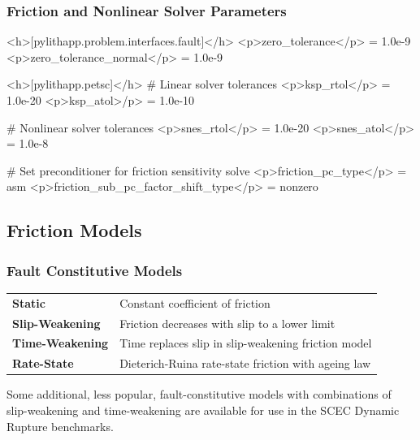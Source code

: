 \documentclass[aspectratio=169]{beamer}
\begin{document}
\begin{frame}[fragile]
  \frametitle{Friction and Nonlinear Solver Parameters}

  \begin{cfg}
<h>[pylithapp.problem.interfaces.fault]</h>
<p>zero_tolerance</p> = 1.0e-9
<p>zero_tolerance_normal</p> = 1.0e-9

<h>[pylithapp.petsc]</h>
# Linear solver tolerances
<p>ksp_rtol</p> = 1.0e-20
<p>ksp_atol>/p> = 1.0e-10

# Nonlinear solver tolerances
<p>snes_rtol</p> = 1.0e-20
<p>snes_atol</p> = 1.0e-8

# Set preconditioner for friction sensitivity solve
<p>friction_pc_type</p> = asm
<p>friction_sub_pc_factor_shift_type</p> = nonzero
\end{cfg}
    
\end{frame}


\subsection{Friction Models}

\begin{frame}
  \frametitle{Fault Constitutive Models}

  \begin{tabular}{lp{3in}}
    {\bf\color{green} Static} & Constant coefficient of friction \\
    {\bf\color{green} Slip-Weakening} & Friction decreases with slip to a
    lower limit \\
    {\bf\color{green} Time-Weakening} & Time replaces slip in slip-weakening
    friction model \\
    {\bf\color{green} Rate-State} & Dieterich-Ruina rate-state friction with
    ageing law 
  \end{tabular}
  
  \vfill 
  Some additional, less popular, fault-constitutive models with
  combinations of slip-weakening and time-weakening are available for
  use in the SCEC Dynamic Rupture benchmarks. 
  \vfill

\end{frame}
\end{document}
